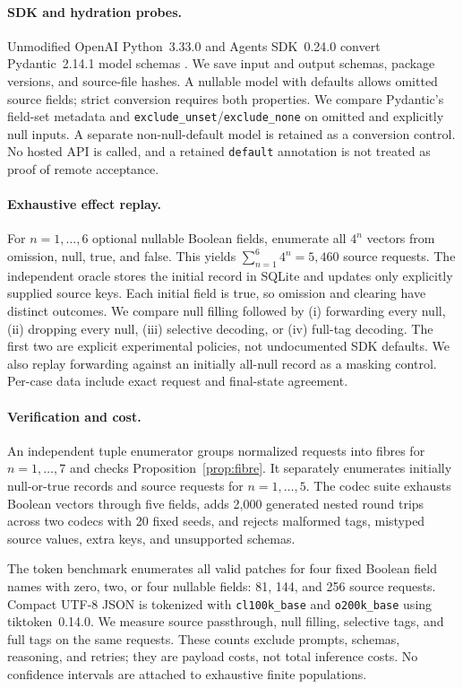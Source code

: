 \documentclass[10pt,twocolumn]{article}
\begin{document}
\paragraph{SDK and hydration probes.}
Unmodified OpenAI Python~3.33.0 and Agents SDK~0.24.0 convert Pydantic~2.14.1 model schemas \citep{sdk,agents}. We save input and output schemas, package versions, and source-file hashes. A nullable model with defaults allows omitted source fields; strict conversion requires both properties. We compare Pydantic's field-set metadata and \texttt{exclude\_unset}/\texttt{exclude\_none} on omitted and explicitly null inputs. A separate non-null-default model is retained as a conversion control. No hosted API is called, and a retained \texttt{default} annotation is not treated as proof of remote acceptance.

\paragraph{Exhaustive effect replay.}
For $n=1,\ldots,6$ optional nullable Boolean fields, enumerate all $4^n$ vectors from omission, null, true, and false. This yields $\sum_{n=1}^{6}4^n=5{,}460$ source requests. The independent oracle stores the initial record in SQLite and updates only explicitly supplied source keys. Each initial field is true, so omission and clearing have distinct outcomes. We compare null filling followed by (i) forwarding every null, (ii) dropping every null, (iii) selective decoding, or (iv) full-tag decoding. The first two are explicit experimental policies, not undocumented SDK defaults. We also replay forwarding against an initially all-null record as a masking control. Per-case data include exact request and final-state agreement.

\paragraph{Verification and cost.}
An independent tuple enumerator groups normalized requests into fibres for $n=1,\ldots,7$ and checks Proposition~\ref{prop:fibre}. It separately enumerates initially null-or-true records and source requests for $n=1,\ldots,5$. The codec suite exhausts Boolean vectors through five fields, adds 2,000 generated nested round trips across two codecs with 20 fixed seeds, and rejects malformed tags, mistyped source values, extra keys, and unsupported schemas.

The token benchmark enumerates all valid patches for four fixed Boolean field names with zero, two, or four nullable fields: 81, 144, and 256 source requests. Compact UTF-8 JSON is tokenized with \texttt{cl100k\_base} and \texttt{o200k\_base} using tiktoken~0.14.0. We measure source passthrough, null filling, selective tags, and full tags on the same requests. These counts exclude prompts, schemas, reasoning, and retries; they are payload costs, not total inference costs. No confidence intervals are attached to exhaustive finite populations.
\end{document}
